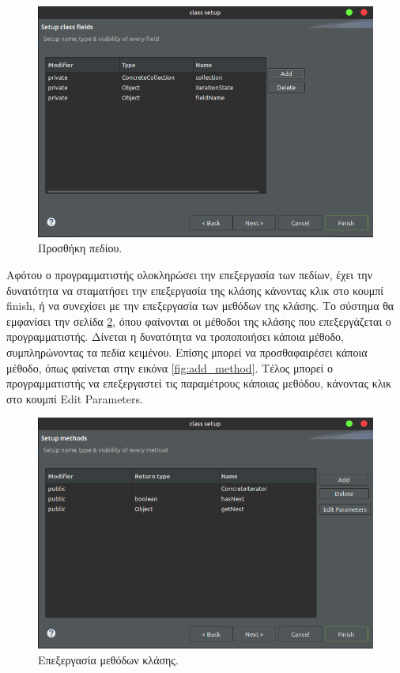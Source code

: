 \begin{figure}[H]
    \centering
    \includegraphics[width=1.0\textwidth]{Figures/add_field.png}
    \caption{Προσθήκη πεδίου.}
    \label{fig:add_field}
\end{figure}
Αφότου ο προγραμματιστής ολοκληρώσει την επεξεργασία των πεδίων, 
έχει την δυνατότητα να σταματήσει την επεξεργασία της κλάσης κάνοντας κλικ στο κουμπί finish, 
ή να συνεχίσει με την επεξεργασία των μεθόδων της κλάσης. Το σύστημα θα εμφανίσει την σελίδα \ref{fig:edit_class_methods}, 
όπου φαίνονται οι μέθοδοι της κλάσης που επεξεργάζεται ο προγραμματιστής. Δίνεται η δυνατότητα να τροποποιήσει κάποια μέθοδο, 
συμπληρώνοντας τα πεδία κειμένου. Επίσης μπορεί να προσθαφαιρέσει κάποια μέθοδο, όπως φαίνεται στην εικόνα \ref{fig:add_method}.
Τέλος μπορεί ο προγραμματιστής να επεξεργαστεί τις παραμέτρους κάποιας μεθόδου, κάνοντας κλικ στο κουμπί Edit Parameters.
\begin{figure}[H]
    \centering
    \includegraphics[width=1.0\textwidth]{Figures/edit_class_methods.png}
    \caption{Επεξεργασία μεθόδων κλάσης.}
    \label{fig:edit_class_methods}
\end{figure}
